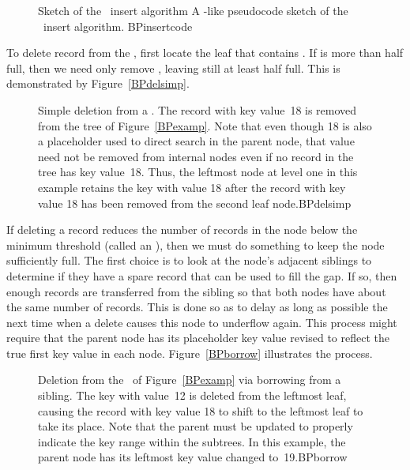 \begin{figure}

\vspace{-\bigskipamount}\vspace{-1pt}

\capt{4.5in}
{Sketch of the \BPtree\ insert algorithm}
{A \Lang-like pseudocode sketch of the \BPtree\ insert algorithm.}
{BPinsertcode}
\end{figure}

To delete record  from the \BPtree,
first locate the leaf  that contains .
If  is more than half full, then we need only remove ,
leaving  still at least half full.
This is demonstrated by Figure~\ref{BPdelsimp}.

\begin{figure}

\medskip
{}
{Simple deletion from a \BPtree.
The record with key value~18 is removed from the tree of
Figure~\ref{BPexamp}.
Note that even though 18 is also a placeholder used to direct search
in the parent node, that value need not be removed from internal nodes
even if no record in the tree has key value~18.
Thus, the leftmost node at level one in this example retains the key
with value 18 after the record with key value 18 has been removed
from the second leaf node.}{BPdelsimp}
\bigskip
\end{figure}

If deleting a record reduces the number of records in the node below
the minimum threshold (called an ), then we must do
something to keep the node sufficiently full.
The first choice is to look at the node's adjacent siblings to
determine if they have a spare record that can be used to fill the
gap.
If so, then enough records are transferred from the
sibling so that both nodes have about the same number of records.
This is done so as to delay as long as possible the next time when a
delete causes this node to underflow again.
This process might require that the parent node has its placeholder
key value revised to reflect the true first key value in each node.
Figure~\ref{BPborrow} illustrates the process.

\begin{figure}
\vspace{-\smallskipamount}

{Deletion from the \BPtree\ of Figure~\ref{BPexamp} via borrowing from
a sibling.
The key with value~12 is deleted from the leftmost leaf, causing the
record with key value 18 to shift to the leftmost leaf to take its
place.
Note that the parent must be updated to properly indicate the key
range within the subtrees.
In this example, the parent node has its leftmost key value changed
to~19.}{BPborrow}
\bigskip
\end{figure}

